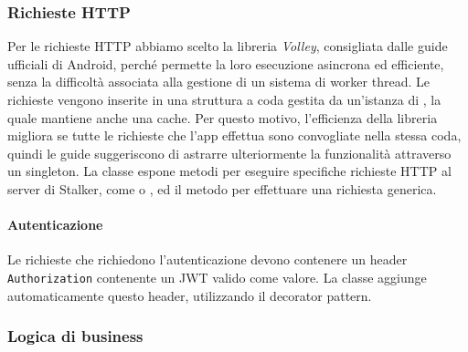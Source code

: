 \documentclass[../../manuale-sviluppatore.tex]{subfiles}
\begin{document}
\subsubsection{Richieste HTTP}%
\label{subs:richieste_http}
Per le richieste HTTP abbiamo scelto la libreria \textit{Volley}, consigliata dalle guide ufficiali di Android, perché permette la loro esecuzione asincrona ed efficiente, senza la difficoltà associata alla gestione di un sistema di worker thread.
Le richieste vengono inserite in una struttura a coda gestita da un'istanza di , la quale mantiene anche una cache.
Per questo motivo, l'efficienza della libreria migliora se tutte le richieste che l'app effettua sono convogliate nella stessa coda, quindi le guide suggeriscono di astrarre ulteriormente la funzionalità attraverso un singleton.
La classe  espone metodi per eseguire specifiche richieste HTTP al server di Stalker, come  o , ed il metodo  per effettuare una richiesta generica.

\paragraph{Autenticazione}%
\label{par:autenticazione}
Le richieste che richiedono l'autenticazione devono contenere un header \texttt{Authorization} contenente un JWT valido come valore.
La classe  aggiunge automaticamente questo header, utilizzando il decorator pattern.
\subsubsection{Logica di business}%
\label{subs:logica_di_business}

\end{document}

